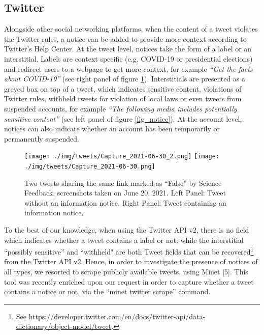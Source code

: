 \documentclass{article}
\begin{document}
\subsection{Twitter}

Alongside other social networking platforms, when the content of a tweet violates the Twitter rules, a notice can be added to provide more context according to Twitter's Help Center. At the tweet level, notices take the form of a label or an interstitial. Labels are context specific (e.g. COVID-19 or presidential elections) and  redirect users to a webpage to get more context, for example {\it ``Get the facts about COVID-19''} (see right panel of figure \ref{fig8}). Interstitials are presented as a greyed box on top of a tweet, which indicates sensitive content, violations of Twitter rules, withheld tweets for violation of local laws or even tweets from suspended accounts, for example {\it ``The following media includes potentially sensitive content''} (see left panel of figure \ref{fig_notice}). At the account level, notices can also indicate whether an account has been temporarily or permanently suspended. 


\begin{figure}[h]
\centering
		\texttt{[image: ./img/tweets/Capture\_2021-06-30\_2.png]}
		\texttt{[image: ./img/tweets/Capture\_2021-06-30.png]}
	\caption{Two tweets sharing the same link marked as ``False'' by Science Feedback, screenshots taken on June $20$, 2021. Left Panel: Tweet without an information notice. Right Panel: Tweet containing an information notice.}
	\label{fig8}
\end{figure}


\smallskip

To the best of our knowledge, when using the Twitter API v2, there is no field which indicates whether a tweet contains a label or not; while the interstitial ``possibly sensitive'' and ``withheld" are both Tweet fields that can be recovered\footnote{See \href{https://developer.twitter.com/en/docs/twitter-api/data-dictionary/object-model/tweet}{https://developer.twitter.com/en/docs/twitter-api/data-dictionary/object-model/tweet}.} from the Twitter API v2. Hence, in order to investigate the presence of notices of all types, we resorted to scrape publicly available tweets, using Minet [5]. This tool was recently enriched upon our request in order to capture whether a tweet contains a notice or not, via the ``minet twitter scrape'' command.
\end{document}
